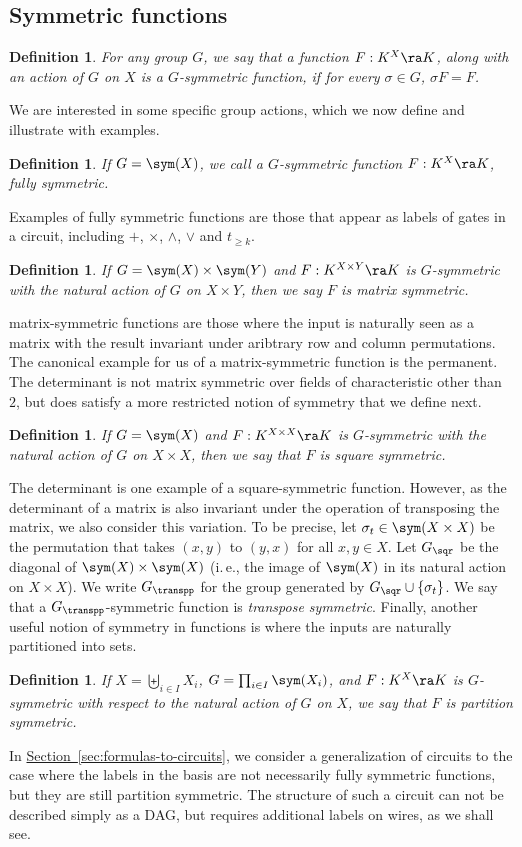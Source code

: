 \documentclass[11pt]{article}
\newcommand{\expref}[2]{\texorpdfstring{\hyperref[#2]{#1~\ref{#2}}}{#1~\ref{#2}}}
\newtheorem{definition}[theorem]{Definition}
\newcommand{\ie}{i.\,e.}
\begin{document}
\subsection{Symmetric functions}\label{sec:symmetric-functions}
\begin{definition}
  For any group $G$, we say that a function $F: K^X \ra K$, along with an action
  of $G$ on $X$ is a \emph{$G$-symmetric function}, if for every $\sigma \in G$,
  $\sigma F = F$.
\end{definition}
We are interested in some specific group actions, which we now define and
illustrate with examples.
\begin{definition}
  \label{def:full-symm}
  If $G=\sym(X)$, we call a $G$-symmetric function $F: K^X \ra K$, \emph{fully
    symmetric}.
\end{definition}
Examples of fully symmetric functions are those that appear as labels of gates
in a circuit, including $+$, $\times$, $\land$, $\lor$ and $t_{\geq k}$.
\begin{definition}
  If $G = \sym(X) \times \sym(Y)$ and $F : K^{X \times Y} \ra K$ is
  $G$-symmetric with the natural action of $G$ on $X \times Y$, then we say $F$
  is \emph{matrix symmetric}.
\end{definition}
matrix-symmetric functions are those where the input is naturally seen as a
matrix with the result invariant under aribtrary row and column permutations.
The canonical example for us of a matrix-symmetric function is the permanent.
The determinant is not matrix symmetric over fields of characteristic other than
$2$, but does satisfy a more restricted notion of symmetry that we define next.
\begin{definition}
  If $G = \sym(X)$ and $F : K^{X \times X} \ra K$ is $G$-symmetric with the
  natural action of $G$ on $X \times X$, then we say that
  $F$ is \emph{square
    symmetric}.
\end{definition}
The determinant is one example of a square-symmetric function. However, as the
determinant of a matrix is also invariant under the operation of transposing the
matrix, we also consider this variation. To be precise, let $\sigma_t \in \sym(X
\times X)$ be the permutation that takes $(x,y)$ to $(y,x)$ for all $x,y\in X$.
Let $G_{\sqr}$ be the diagonal of $\sym(X)\times \sym(X)$ (\ie, the image of
$\sym(X)$ in its natural action on $X \times X$). We write $G_{\transpp}$ for the
group generated by $G_{\sqr} \cup \{\sigma_t\}$. We say that
%
a $G_{\transpp}$-symmetric function is \emph{transpose symmetric}.
Finally, another useful notion of symmetry in functions is where the inputs are
naturally partitioned into sets.
\begin{definition}
  If $X = \biguplus_{i \in I} X_i$, $G = \prod_{i \in I}\sym(X_i)$, and $F: K^X
  \ra K$ is $G$-symmetric with respect to the natural action of $G$ on $X$, we
  say that
  $F$ is \emph{partition symmetric}.
\end{definition}
In \expref{Section}{sec:formulas-to-circuits}, we consider a generalization of
circuits to the case where the labels in the basis are not necessarily fully
symmetric functions, but they are still partition symmetric. The structure of
such a circuit can not be described simply as a DAG, but requires additional
labels on wires, as we shall see.
\end{document}
